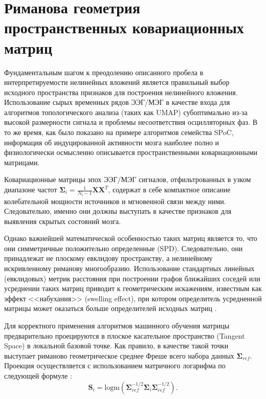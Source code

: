\section{Риманова геометрия пространственных ковариационных матриц}
\label{sec:riemannian_geometry}

Фундаментальным шагом к преодолению описанного пробела в интерпретируемости нелинейных вложений является правильный выбор исходного пространства признаков для построения нелинейного вложения. Использование сырых временных рядов ЭЭГ/МЭГ в качестве входа для алгоритмов топологического анализа (таких как UMAP) субоптимально из-за высокой размерности сигнала и проблемы несоответствия осцилляторных фаз. В то же время, как было показано на примере алгоритмов семейства SPoC, информация об индуцированной активности мозга наиболее полно и физиологически осмысленно описывается пространственными ковариационными матрицами.

Ковариационные матрицы эпох ЭЭГ/МЭГ сигналов, отфильтрованных в узком диапазоне частот $\mathbf{\Sigma}_i = \frac{1}{N_t - 1} \mathbf{X} \mathbf{X}^T$, содержат в себе компактное описание колебательной мощности источников и мгновенной связи между ними. Следовательно, именно они должны выступать в качестве признаков для выявления скрытых состояний мозга.

Однако важнейшей математической особенностью таких матриц является то, что они симметричные положительно определенные (SPD). Следовательно, они принадлежат не плоскому евклидову пространству, а нелинейному искривленному риманову многообразию. Использование стандартных линейных (евклидовых) метрик расстояния при построении графов ближайших соседей или усреднении таких матриц приводит к геометрическим искажениям, известным как эффект <<набухания>> (swelling effect), при котором определитель усредненной матрицы может оказаться больше определителей исходных матриц \cite{barachant2013classification}.

Для корректного применения алгоритмов машинного обучения матрицы предварительно проецируются в плоское касательное пространство (Tangent Space) в локальной базовой точке. Как правило, в качестве такой точки выступает риманово геометрическое среднее Фреше всего набора данных $\mathbf{\Sigma}_{ref}$. Проекция осуществляется с использованием матричного логарифма по следующей формуле \cite{yger2017riemann}:
\begin{equation}
	\mathbf{S}_i = \text{logm}\left( \mathbf{\Sigma}_{ref}^{-1/2} \mathbf{\Sigma}_i \mathbf{\Sigma}_{ref}^{-1/2} \right).
\end{equation}

